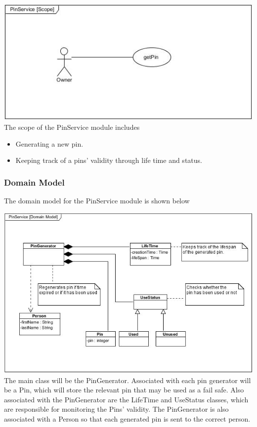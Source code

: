 \documentclass[a4paper,12pt]{article}
\begin{document}
	\includegraphics[width=1\textwidth]{./Pictures/UML/Usecase/PinServiceUseCase.jpg}\\[0cm]
	
	{\noindent}The scope of the PinService module includes
	\begin{itemize}
		\item Generating a new pin.
		\item Keeping track of a pins' validity through life time and status.
	\end{itemize}
	
	\subsubsection{Domain Model}
	The domain model for the PinService module is shown below
	
	\includegraphics[width=1\textwidth]{./Pictures/UML/PinServiceDomain.jpg}\\[0cm]	
	
	{\noindent}The main class will be the PinGenerator. Associated with each pin generator will be a Pin, which will store the relevant pin that may be used as a fail safe. Also associated with the PinGenerator are the LifeTime and UseStatus classes, which are responsible for monitoring the Pins' validity. The PinGenerator is also associated with a Person so that each generated pin is sent to the correct person.
	
\end{document}
